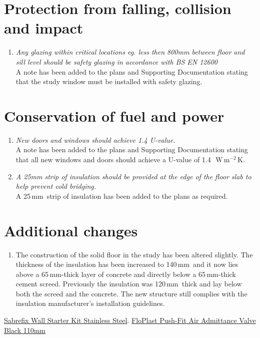 \documentclass{extension}
\newcommand{\mm}{\,$\mathrm{mm}$}
\newcommand{\uunit}{\,$\mathrm{W\,m^{-2}\,K}$}
\begin{document}
\section{Protection from falling, collision and impact}
\begin{enumerate}
\item {\it Any glazing within critical locations eg. less then 800mm between floor and sill level should be safety glazing in accordance with BS EN 12600}\\
A note has been added to the plans and Supporting Documentation stating that the study window must be installed with safety glazing.
\end{enumerate}

\section{Conservation of fuel and power}
\begin{enumerate}
\item {\it New doors and windows should achieve 1.4 U-value.}\\
A note has been added to the plans and Supporting Documentation stating that all new windows and doors should achieve a U-value of 1.4~\uunit .
\item {\it A 25mm strip of insulation should be provided at the edge of the floor slab to help prevent cold bridging.}\\
A 25\mm\ strip of insulation has been added to the plans as required.
\end{enumerate}

\section{Additional changes}
\begin{enumerate}
\item The construction of the solid floor in the study has been altered slightly. The thickness of the insulation has been increased to 140\mm\ and it now lies above a 65\mm -thick layer of concrete and directly below a 65\mm -thick cement screed. Previously the insulation was 120\mm\ thick and lay below both the screed and the concrete. The new structure still complies with the insulation manufacturer's installation guidelines.
\end{enumerate}


\begin{thebibliography}{9}
 \href{https://www.screwfix.com/p/sabrefix-wall-starter-kit-stainless-steel/56037?kpid=56037&cm_mmc=Google-_-Datafeed-_-Building%20and%20Doors?kpid=KINASEKPID&cm_mmc=Google-_-TOKEN1-_-TOKEN2&gclid=EAIaIQobChMIvrnvoZmQgQMVjIFQBh3P7gMrEAQYAiABEgIWrvD_BwE&gclsrc=aw.ds}{Sabrefix Wall Starter Kit Stainless Steel}.
\href{https://www.screwfix.com/p/floplast-push-fit-air-admittance-valve-black-110mm/35001} {FloPlast Push-Fit Air Admittance Valve Black 110mm}



\end{thebibliography}
\end{document}
